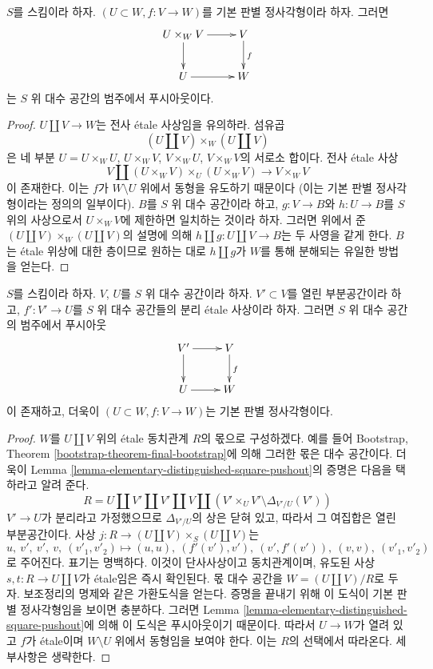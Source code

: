\begin{lemma}
\label{lemma-elementary-distinguished-square-pushout}
$S$를 스킴이라 하자. $(U \subset W, f : V \to W)$를
기본 판별 정사각형이라 하자. 그러면
$$
\xymatrix{
U \times_W V \ar[r] \ar[d] &
V \ar[d]^f \\
U \ar[r] & W
}
$$
는 $S$ 위 대수 공간의 범주에서 푸시아웃이다.
\end{lemma}

\begin{proof}
$U \amalg V \to W$는 전사 \'etale 사상임을 유의하라.
섬유곱
$$
(U \amalg V) \times_W (U \amalg V)
$$
은 네 부분 $U = U \times_W U$, $U \times_W V$,
$V \times_W U$, $V \times_W V$의 서로소 합이다.
전사 \'etale 사상
$$
V \amalg (U \times_W V) \times_U (U \times_W V) \longrightarrow V \times_W V
$$
이 존재한다. 이는 $f$가 $W \setminus U$ 위에서 동형을 유도하기 때문이다
(이는 기본 판별 정사각형이라는 정의의 일부이다).
$B$를 $S$ 위 대수 공간이라 하고, $g : V \to B$와 $h : U \to B$를
$S$ 위의 사상으로서 $U \times_W V$에 제한하면 일치하는 것이라 하자.
그러면 위에서 준 $(U \amalg V) \times_W (U \amalg V)$의 설명에 의해
$h \amalg g : U \amalg V \to B$는 두 사영을 같게 한다.
$B$는 \'etale 위상에 대한 층이므로 원하는 대로
$h \amalg g$가 $W$를 통해 분해되는 유일한 방법을 얻는다.
\end{proof}

\begin{lemma}
\label{lemma-construct-elementary-distinguished-square}
$S$를 스킴이라 하자. $V$, $U$를 $S$ 위 대수 공간이라 하자.
$V' \subset V$를 열린 부분공간이라 하고, $f' : V' \to U$를
$S$ 위 대수 공간들의 분리 \'etale 사상이라 하자.
그러면 $S$ 위 대수 공간의 범주에서 푸시아웃
$$
\xymatrix{
V' \ar[r] \ar[d] &
V \ar[d]^f \\
U \ar[r] & W
}
$$
이 존재하고, 더욱이 $(U \subset W, f : V \to W)$는
기본 판별 정사각형이다.
\end{lemma}

\begin{proof}
$W$를 $U \amalg V$ 위의 \'etale 동치관계 $R$의 몫으로 구성하겠다.
예를 들어 Bootstrap, Theorem \ref{bootstrap-theorem-final-bootstrap}에 의해
그러한 몫은 대수 공간이다. 더욱이 Lemma
\ref{lemma-elementary-distinguished-square-pushout}의 증명은 다음을
택하라고 알려 준다.
$$
R = U \amalg V' \amalg V' \amalg V \amalg
(V' \times_U V' \setminus \Delta_{V'/U}(V'))
$$
$V' \to U$가 분리라고 가정했으므로 $\Delta_{V'/U}$의 상은 닫혀 있고,
따라서 그 여집합은 열린 부분공간이다. 사상
$j : R \to (U \amalg V) \times_S (U \amalg V)$는
$$
u,\ v',\ v',\ v,\ (v'_1, v'_2) \mapsto
(u, u),\ (f'(v'), v'),\ (v', f'(v')),\ (v, v),\ (v'_1, v'_2)
$$
로 주어진다. 표기는 명백하다. 이것이 단사사상이고 동치관계이며,
유도된 사상 $s, t : R \to U \amalg V$가 \'etale임은 즉시 확인된다.
몫 대수 공간을 $W = (U \amalg V)/R$로 두자.
보조정리의 명제와 같은 가환도식을 얻는다.
증명을 끝내기 위해 이 도식이 기본 판별 정사각형임을 보이면 충분하다.
그러면 Lemma \ref{lemma-elementary-distinguished-square-pushout}에 의해
이 도식은 푸시아웃이기 때문이다. 따라서 $U \to W$가 열려 있고
$f$가 \'etale이며 $W \setminus U$ 위에서 동형임을 보여야 한다.
이는 $R$의 선택에서 따라온다. 세부사항은 생략한다.
\end{proof}

